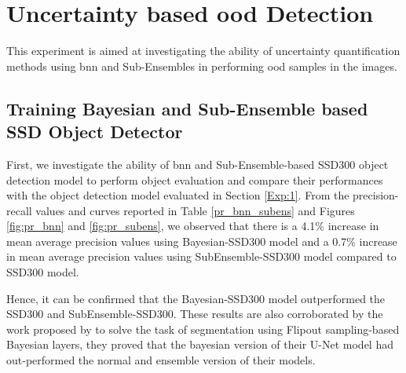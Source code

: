     \section{Uncertainty based \acrlong{ood} Detection}
    This experiment is aimed at investigating the ability of uncertainty quantification methods using \acrlong{bnn} and Sub-Ensembles in performing \acrshort{ood} samples in the images.
    \subsection{Training Bayesian and Sub-Ensemble based SSD Object Detector}
    \label{exp"uq_methods}
    First, we investigate the ability of \acrshort{bnn} and Sub-Ensemble-based SSD300 object detection model to perform object evaluation and compare their performances with the object detection model evaluated in Section \ref{Exp:1}. From the precision-recall values and curves reported in Table \ref{pr_bnn_subens} and Figures \ref{fig:pr_bnn} and \ref{fig:pr_subens}, we observed that there is a 4.1\% increase in mean average precision values using Bayesian-SSD300 model and a 0.7\% increase in mean average precision values using SubEnsemble-SSD300 model compared to SSD300 model. 
    
    Hence, it can be confirmed that the Bayesian-SSD300 model outperformed the SSD300 and SubEnsemble-SSD300.  These results are also corroborated by the work proposed by \citet{LaBonte2019} to solve the task of segmentation using Flipout sampling-based Bayesian layers, they proved that the bayesian version of their U-Net model had out-performed the normal and ensemble version of their models.
    
